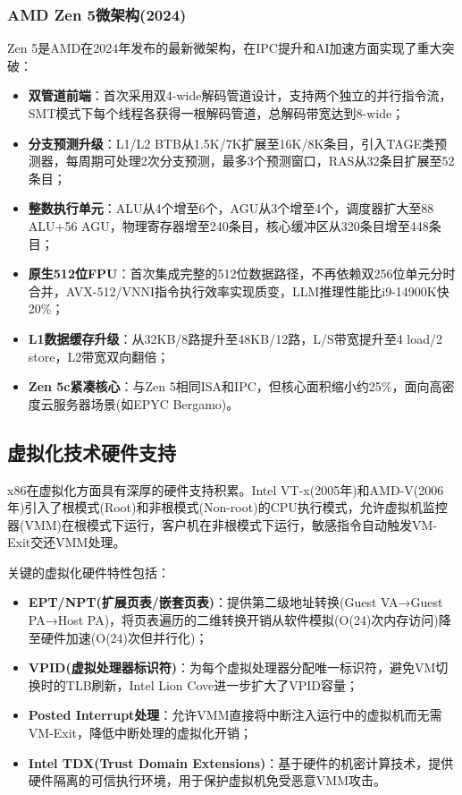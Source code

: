 \documentclass[12pt,a4paper]{IEEEtran}
\begin{document}
\subsubsection{AMD Zen 5微架构(2024)}

Zen 5是AMD在2024年发布的最新微架构，在IPC提升和AI加速方面实现了重大突破\cite{amd2024zen5}：

\begin{itemize}
\item \textbf{双管道前端}：首次采用双4-wide解码管道设计，支持两个独立的并行指令流，SMT模式下每个线程各获得一根解码管道，总解码带宽达到8-wide；
\item \textbf{分支预测升级}：L1/L2 BTB从1.5K/7K扩展至16K/8K条目，引入TAGE类预测器，每周期可处理2次分支预测，最多3个预测窗口，RAS从32条目扩展至52条目；
\item \textbf{整数执行单元}：ALU从4个增至6个，AGU从3个增至4个，调度器扩大至88 ALU+56 AGU，物理寄存器增至240条目，核心缓冲区从320条目增至448条目；
\item \textbf{原生512位FPU}：首次集成完整的512位数据路径，不再依赖双256位单元分时合并，AVX-512/VNNI指令执行效率实现质变，LLM推理性能比i9-14900K快20\%；
\item \textbf{L1数据缓存升级}：从32KB/8路提升至48KB/12路，L/S带宽提升至4 load/2 store，L2带宽双向翻倍；
\item \textbf{Zen 5c紧凑核心}：与Zen 5相同ISA和IPC，但核心面积缩小约25\%，面向高密度云服务器场景(如EPYC Bergamo)。
\end{itemize}

\subsection{虚拟化技术硬件支持}

x86在虚拟化方面具有深厚的硬件支持积累。Intel VT-x(2005年)和AMD-V(2006年)引入了根模式(Root)和非根模式(Non-root)的CPU执行模式，允许虚拟机监控器(VMM)在根模式下运行，客户机在非根模式下运行，敏感指令自动触发VM-Exit交还VMM处理\cite{adams2006intelvt}。

关键的虚拟化硬件特性包括：
\begin{itemize}
\item \textbf{EPT/NPT(扩展页表/嵌套页表)}：提供第二级地址转换(Guest VA→Guest PA→Host PA)，将页表遍历的二维转换开销从软件模拟(O(24)次内存访问)降至硬件加速(O(24)次但并行化)；
\item \textbf{VPID(虚拟处理器标识符)}：为每个虚拟处理器分配唯一标识符，避免VM切换时的TLB刷新，Intel Lion Cove进一步扩大了VPID容量；
\item \textbf{Posted Interrupt处理}：允许VMM直接将中断注入运行中的虚拟机而无需VM-Exit，降低中断处理的虚拟化开销；
\item \textbf{Intel TDX(Trust Domain Extensions)}：基于硬件的机密计算技术，提供硬件隔离的可信执行环境，用于保护虚拟机免受恶意VMM攻击\cite{intel2023tdx}。
\end{itemize}
\end{document}
